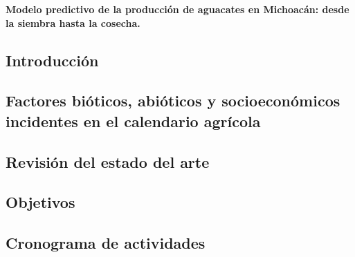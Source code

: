 \documentclass[12pt,oneside,article]{memoir}
\begin{document}
\thispagestyle{firstpagestyle}
\textbf{Modelo predictivo de la producción de aguacates en Michoacán: desde la siembra hasta la cosecha.}

\subsection*{Introducción}


\subsection{Factores bióticos, abióticos y socioeconómicos incidentes en el calendario agrícola}

\subsection{Revisión del estado del arte}


\subsection{Objetivos}


\subsection{Cronograma de actividades}


%






\end{document}
